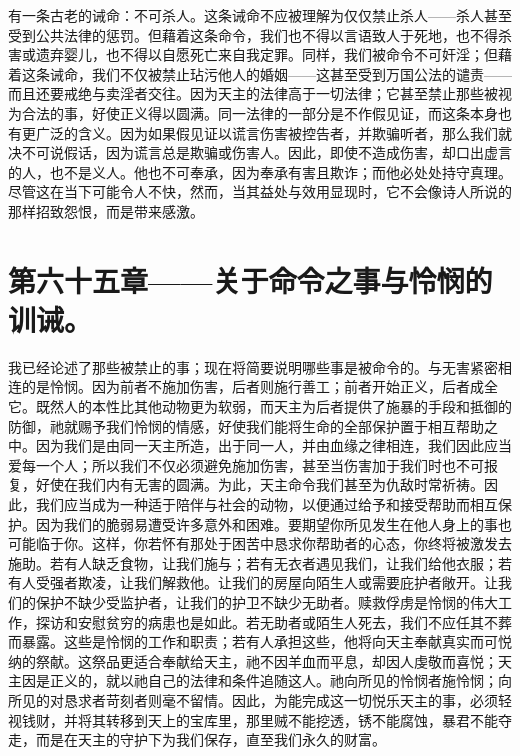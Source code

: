有一条古老的诫命：不可杀人。这条诫命不应被理解为仅仅禁止杀人——杀人甚至受到公共法律的惩罚。但藉着这条命令，我们也不得以言语致人于死地，也不得杀害或遗弃婴儿，也不得以自愿死亡来自我定罪。同样，我们被命令不可奸淫；但藉着这条诫命，我们不仅被禁止玷污他人的婚姻——这甚至受到万国公法的谴责——而且还要戒绝与卖淫者交往。因为天主的法律高于一切法律；它甚至禁止那些被视为合法的事，好使正义得以圆满。同一法律的一部分是不作假见证，而这条本身也有更广泛的含义。因为如果假见证以谎言伤害被控告者，并欺骗听者，那么我们就决不可说假话，因为谎言总是欺骗或伤害人。因此，即使不造成伤害，却口出虚言的人，也不是义人。他也不可奉承，因为奉承有害且欺诈；而他必处处持守真理。尽管这在当下可能令人不快，然而，当其益处与效用显现时，它不会像诗人所说的那样招致怨恨，而是带来感激。\par


\section{第六十五章——关于命令之事与怜悯的训诫。}

我已经论述了那些被禁止的事；现在将简要说明哪些事是被命令的。与无害紧密相连的是怜悯。因为前者不施加伤害，后者则施行善工；前者开始正义，后者成全它。既然人的本性比其他动物更为软弱，而天主为后者提供了施暴的手段和抵御的防御，祂就赐予我们怜悯的情感，好使我们能将生命的全部保护置于相互帮助之中。因为我们是由同一天主所造，出于同一人，并由血缘之律相连，我们因此应当爱每一个人；所以我们不仅必须避免施加伤害，甚至当伤害加于我们时也不可报复，好使在我们内有无害的圆满。为此，天主命令我们甚至为仇敌时常祈祷。因此，我们应当成为一种适于陪伴与社会的动物，以便通过给予和接受帮助而相互保护。因为我们的脆弱易遭受许多意外和困难。要期望你所见发生在他人身上的事也可能临于你。这样，你若怀有那处于困苦中恳求你帮助者的心态，你终将被激发去施助。若有人缺乏食物，让我们施与；若有无衣者遇见我们，让我们给他衣服；若有人受强者欺凌，让我们解救他。让我们的房屋向陌生人或需要庇护者敞开。让我们的保护不缺少受监护者，让我们的护卫不缺少无助者。赎救俘虏是怜悯的伟大工作，探访和安慰贫穷的病患也是如此。若无助者或陌生人死去，我们不应任其不葬而暴露。这些是怜悯的工作和职责；若有人承担这些，他将向天主奉献真实而可悦纳的祭献。这祭品更适合奉献给天主，祂不因羊血而平息，却因人虔敬而喜悦；天主因是正义的，就以祂自己的法律和条件追随这人。祂向所见的怜悯者施怜悯；向所见的对恳求者苛刻者则毫不留情。因此，为能完成这一切悦乐天主的事，必须轻视钱财，并将其转移到天上的宝库里，那里贼不能挖透，锈不能腐蚀，暴君不能夺走，而是在天主的守护下为我们保存，直至我们永久的财富。\par

